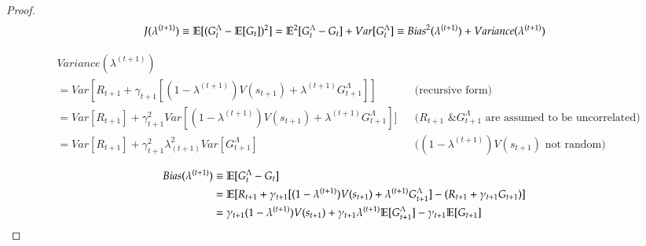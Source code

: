\begin{proof}
\begin{equation}
J(\lambda^{(t+1)}) \equiv \mathbb{E}[(G_t^\Lambda - \mathbb{E}[G_t])^2] = \mathbb{E}^2[G_t^\Lambda - G_t] + Var[G_t^\Lambda] \equiv {Bias}^2(\lambda^{(t+1)}) + Variance(\lambda^{(t+1)})
\nonumber
\end{equation}

\begin{equation}
\begin{aligned}
& Variance(\lambda^{(t+1)})\\
& = Var[R_{t+1} + \gamma_{t+1} [(1 - \lambda^{(t+1)})V(s_{t+1}) + \lambda^{(t+1)}G_{t+1}^\Lambda]] && \text{(recursive form)}\\
& = Var[R_{t+1}] + \gamma_{t+1}^2 Var[(1 - \lambda^{(t+1)})V(s_{t+1}) + \lambda^{(t+1)}G_{t+1}^\Lambda]] && \text{($R_{t+1}$ \& $G_{t+1}^\Lambda$ are assumed to be uncorrelated)}\\
& = Var[R_{t+1}] + \gamma_{t+1}^2 \lambda_{(t+1)}^2Var[G_{t+1}^\Lambda] && \text{($(1 - \lambda^{(t+1)})V(s_{t+1})$ not random)}
\end{aligned}
\nonumber
\end{equation}

\begin{equation}
\begin{aligned}
Bias(\lambda^{(t+1)}) & \equiv \mathbb{E}[G_t^\Lambda - G_t]\\
& = \mathbb{E}[R_{t+1} + \gamma_{t+1} [(1 - \lambda^{(t+1)})V(s_{t+1}) + \lambda^{(t+1)}G_{t+1}^\Lambda] - (R_{t+1} + \gamma_{t+1} G_{t+1})] \\
& = \gamma_{t+1} (1 - \lambda^{(t+1)})V(s_{t+1}) + \gamma_{t+1} \lambda^{(t+1)} \mathbb{E}[G_{t+1}^\Lambda] - \gamma_{t+1} \mathbb{E}[G_{t+1}]
\end{aligned}
\nonumber
\end{equation}


\end{proof}
